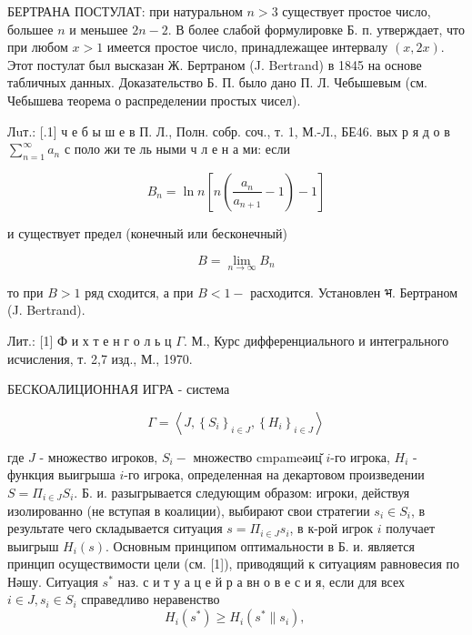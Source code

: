 \documentclass[10pt]{article}
\begin{document}
БЕРТРАНА ПОСТУЛАТ: при натуральном $n>3$ существует простое число, большее $n$ и меньшее $2 n-2$. В более слабой формулировке Б. п. утверждает, что при любом $x>1$ имеется простое число, принадлежащее интервалу $(x, 2 x)$. Этот постулат был высказан Ж. Бертраном (J. Bertrand) в 1845 на основе табличных данных. Доказательство Б. П. было дано П. Л. Чебышевым (см. Чебышева теорема о распределении простых чисел).



Лuт.: [.1] ч е б ы ш е в П. Л., Полн. собр. соч., т. 1, М.-Л., БЕ46. вых р я д о в $\sum_{n=1}^{\infty} a_{n}$ с поло жи те ль ными ч л е н а ми: если



\[

B_{n}=\ln n\left[n\left(\frac{a_{n}}{a_{n+1}}-1\right)-1\right]

\]



и существует предел (конечный или бесконечный)



\[

B=\lim _{n \rightarrow \infty} B_{n}

\]



то при $B>1$ ряд сходится, а при $B<1-$ расходится. Установлен भ. Бертраном (J. Bertrand).



Лит.: [1] Ф и х т е н г о л ь ц $\Gamma$. М., Курс дифференциального и интегрального исчисления, т. 2,7 изд., М., 1970.



БЕСКОАЛИЦИОННАЯ ИГРА - система



\[

\Gamma=\left\langle J,\left\{S_{i}\right\}_{i \in J},\left\{H_{i}\right\}_{i \in J}\right\rangle

\]



где $J$ - множество игроков, $S_{i}-$ множество cmpameәиц̆ $i$-го игрока, $H_{i}$ - функция выигрыша $i$-го игрока, определенная на декартовом произведении $S=\Pi_{i \in J} S_{i}$. Б. и. разыгрывается следующим образом: игроки, действуя изолированно (не вступая в коалиции), выбирают свои стратегии $s_{i} \in S_{i}$, в результате чего складывается ситуация $s=\Pi_{i \in J} s_{i}$, в к-рой игрок $i$ получает выигрыш $H_{i}(s)$. Основным принципом оптимальности в Б. и. является принцип осуществимости цели (см. [1]), приводящий к ситуациям равновесия по Нәшу. Ситуация $s^{*}$ наз. с и т у а ц е й р а вн о в е с и я, если для всех $i \in J, s_{i} \in S_{i}$ справедливо неравенство\[

H_{i}\left(s^{*}\right) \geqslant H_{i}\left(s^{*} \| s_{i}\right) \text {, }

\]
\end{document}

